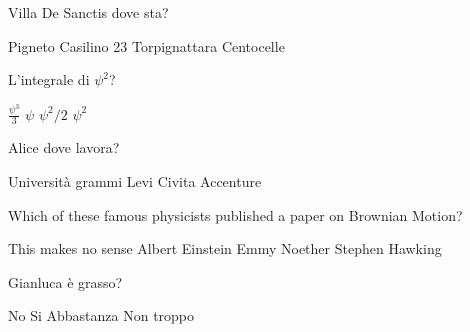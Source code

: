 \documentclass{exam}
\begin{document}
\begin{center}
\end{center}
\vspace{5mm}
\vspace{5mm}
\vspace{5mm}
\begin{questions}
\question[10] Villa De Sanctis dove sta?
\begin{choices}
\choice Pigneto
\choice Casilino 23
\choice Torpignattara
\choice Centocelle
\end{choices}
\question[10] L'integrale di $\psi^{2}$?
\begin{choices}
\choice $\frac{\psi^{3}}{3}$
\choice $\psi$
\choice $\psi^{2}/2$
\choice $\psi^{2}$
\end{choices}
\question[10] Alice dove lavora?
\begin{choices}
\choice Università
 grammi
\choice Levi Civita
\choice Accenture
\end{choices}
\question[10] Which of these famous physicists published a paper on Brownian Motion?
\begin{choices}
\choice This makes no sense
\choice Albert Einstein
\choice Emmy Noether
\choice Stephen Hawking 
\end{choices}
\question[10] Gianluca è grasso?
\begin{choices}
\choice No
\choice Si
\choice Abbastanza
\choice Non troppo
\end{choices}
\end{questions}
           
\end{document}

